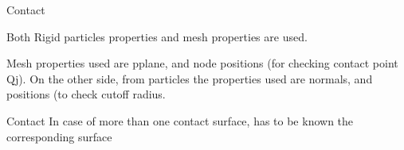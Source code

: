 

Contact

Both Rigid particles properties and mesh properties are used.

Mesh properties used are pplane, and node positions (for checking contact point Qj). On the other side, from particles the properties used are normals, and positions (to check cutoff radius.


Contact
In case of more than one contact surface, has to be known the corresponding surface
